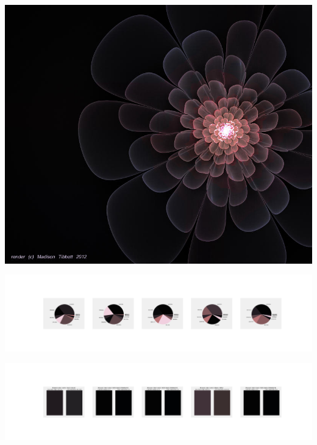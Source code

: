\documentclass[11pt]{article}
\begin{document}
\begin{landscape}
    \begin{center}
    \includegraphics[width=\textwidth]{./nbimg/file (3).jpg}
    \end{center}

    \begin{center}
    \includegraphics[width=250mm]{./nbimg/pie-222.jpg}
    \end{center}

    \begin{center}
    \includegraphics[width=250mm]{./nbimg/peak-222.jpg}
    \end{center}
    


\end{landscape}
\end{document}
